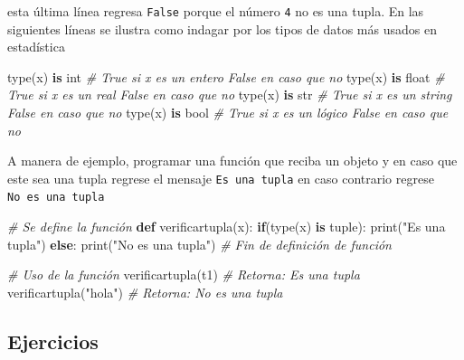 \documentclass[
]{book}
\newenvironment{Shaded}{\begin{snugshade}}{\end{snugshade}}
\newcommand{\BuiltInTok}[1]{#1}
\newcommand{\CommentTok}[1]{\textcolor[rgb]{0.56,0.35,0.01}{\textit{#1}}}
\newcommand{\ControlFlowTok}[1]{\textcolor[rgb]{0.13,0.29,0.53}{\textbf{#1}}}
\newcommand{\KeywordTok}[1]{\textcolor[rgb]{0.13,0.29,0.53}{\textbf{#1}}}
\newcommand{\NormalTok}[1]{#1}
\newcommand{\StringTok}[1]{\textcolor[rgb]{0.31,0.60,0.02}{#1}}
\theoremstyle{definition}
\theoremstyle{definition}
\theoremstyle{definition}
\theoremstyle{definition}
\theoremstyle{remark}
\begin{document}
esta última línea regresa \texttt{False} porque el número \texttt{4} no es una tupla. En las siguientes líneas se ilustra como indagar por los tipos de datos más usados en estadística

\begin{Shaded}
\begin{Highlighting}[]
\BuiltInTok{type}\NormalTok{(x) }\KeywordTok{is} \BuiltInTok{int}    \CommentTok{\# True si x es un entero False en caso que no}
\BuiltInTok{type}\NormalTok{(x) }\KeywordTok{is} \BuiltInTok{float}  \CommentTok{\# True si x es un real False en caso que no}
\BuiltInTok{type}\NormalTok{(x) }\KeywordTok{is} \BuiltInTok{str}    \CommentTok{\# True si x es un string  False en caso que no}
\BuiltInTok{type}\NormalTok{(x) }\KeywordTok{is} \BuiltInTok{bool}   \CommentTok{\# True si x es un lógico  False en caso que no}
\end{Highlighting}
\end{Shaded}

A manera de ejemplo, programar una función que reciba un objeto y en caso que este sea una tupla regrese el mensaje \texttt{\textquotesingle{}Es\ una\ tupla\textquotesingle{}} en caso contrario regrese \texttt{\textquotesingle{}No\ es\ una\ tupla\textquotesingle{}}

\begin{Shaded}
\begin{Highlighting}[]
\CommentTok{\# Se define la función }
\KeywordTok{def}\NormalTok{ verificartupla(x):}
  \ControlFlowTok{if}\NormalTok{(}\BuiltInTok{type}\NormalTok{(x) }\KeywordTok{is} \BuiltInTok{tuple}\NormalTok{):}
    \BuiltInTok{print}\NormalTok{(}\StringTok{"Es una tupla"}\NormalTok{)}
  \ControlFlowTok{else}\NormalTok{:}
    \BuiltInTok{print}\NormalTok{(}\StringTok{"No es una tupla"}\NormalTok{)}
\CommentTok{\# Fin de definición de función}
\end{Highlighting}
\end{Shaded}

\begin{Shaded}
\begin{Highlighting}[]
\CommentTok{\# Uso de  la función }
\NormalTok{verificartupla(t1) }\CommentTok{\# Retorna:  Es una tupla}
\NormalTok{verificartupla(}\StringTok{"hola"}\NormalTok{) }\CommentTok{\# Retorna:  No es una tupla}
\end{Highlighting}
\end{Shaded}

\hypertarget{ejercicios}{%
\subsection{Ejercicios}\label{ejercicios}}
\end{document}
